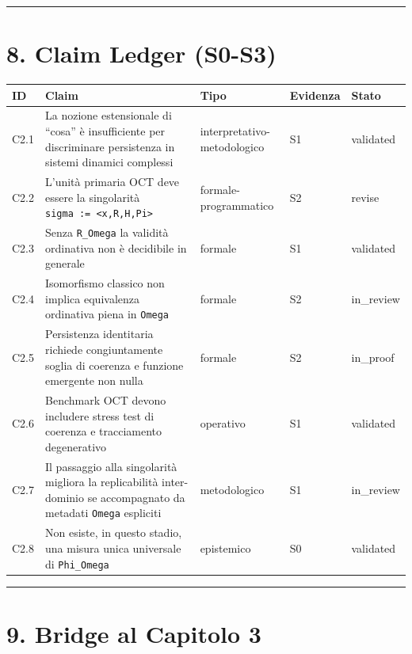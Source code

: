 \begin{center}\rule{0.5\linewidth}{0.5pt}\end{center}

\section{8. Claim Ledger (S0-S3)}

{\def\LTcaptype{none} %
\begin{longtable}[]{@{}lllll@{}}
\toprule\noalign{}
ID & Claim & Tipo & Evidenza & Stato \\
\midrule\noalign{}
\endhead
\bottomrule\noalign{}
\endlastfoot
C2.1 & La nozione estensionale di ``cosa'' è insufficiente per discriminare persistenza in sistemi dinamici complessi & interpretativo-metodologico & S1 & validated \\
C2.2 & L'unità primaria OCT deve essere la singolarità \texttt{sigma\ :=\ \textless{}x,R,H,Pi\textgreater{}} & formale-programmatico & S2 & revise \\
C2.3 & Senza \texttt{R\_Omega} la validità ordinativa non è decidibile in generale & formale & S1 & validated \\
C2.4 & Isomorfismo classico non implica equivalenza ordinativa piena in \texttt{Omega} & formale & S2 & in\_review \\
C2.5 & Persistenza identitaria richiede congiuntamente soglia di coerenza e funzione emergente non nulla & formale & S2 & in\_proof \\
C2.6 & Benchmark OCT devono includere stress test di coerenza e tracciamento degenerativo & operativo & S1 & validated \\
C2.7 & Il passaggio alla singolarità migliora la replicabilità inter-dominio se accompagnato da metadati \texttt{Omega} espliciti & metodologico & S1 & in\_review \\
C2.8 & Non esiste, in questo stadio, una misura unica universale di \texttt{Phi\_Omega} & epistemico & S0 & validated \\
\end{longtable}
}

\begin{center}\rule{0.5\linewidth}{0.5pt}\end{center}

\section{9. Bridge al Capitolo 3}

